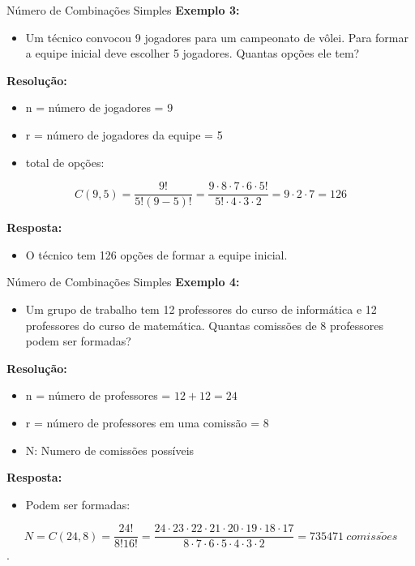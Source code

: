 \documentclass[aspectratio=169]{beamer}
\begin{document}
\begin{frame}{Número de Combinações Simples}
    \textbf{Exemplo 3:}
    \begin{itemize}
        \item[] Um técnico convocou 9 jogadores para um campeonato de vôlei. Para formar a equipe inicial deve escolher 5 jogadores. Quantas opções ele tem?
    \end{itemize}

    \pause
    \vspace{2mm}

    \textbf{Resolução:}

    \begin{itemize}
        \item[] n = número de jogadores = 9 \pause
        \item[] r = número de jogadores da equipe = 5 \pause
        \item[] total de opções:
    \end{itemize}

    $$ C(9,5) = \frac{9!}{5! (9-5)!} = \frac{9 \cdot8 \cdot 7 \cdot 6 \cdot 5!}{5! \cdot 4 \cdot 3 \cdot 2} = 9 \cdot 2 \cdot 7 = 126$$

    \textbf{Resposta:}
    \begin{itemize}
        \item[] O técnico tem 126 opções de formar a equipe inicial.
    \end{itemize}
\end{frame}

\begin{frame}{Número de Combinações Simples}
    \textbf{Exemplo 4:}
    \begin{itemize}
        \item[] Um grupo de trabalho tem 12 professores do curso de informática e 12 professores do curso de matemática. Quantas comissões de 8 professores podem ser formadas?
    \end{itemize}

    \pause
    \vspace{2mm}

    \textbf{Resolução:}

    \begin{itemize}
        \item[] n = número de professores = $12 + 12 = 24$ \pause
        \item[] r = número de professores em uma comissão = 8 \pause
        \item[] N: Numero de comissões possíveis
    \end{itemize}

    \pause
    \textbf{Resposta:}
    \begin{itemize}
        \item[] Podem ser formadas:
    \end{itemize}

    $$ N = C(24,8) = \frac{24!}{8! 16!} = \frac{24 \cdot 23 \cdot 22 \cdot 21 \cdot 20 \cdot 19 \cdot 18 \cdot 17}{8 \cdot 7 \cdot 6 \cdot 5 \cdot 4 \cdot 3 \cdot 2} = 735471 ~ comiss\tilde{o}es$$  .

\end{frame}
\end{document}
